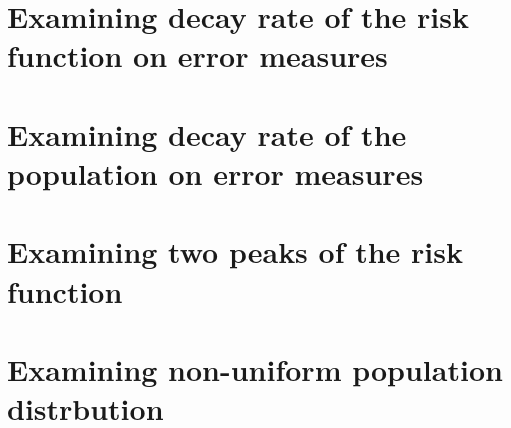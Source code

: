 \section{Examining decay rate of the risk function on error measures}

\section{Examining decay rate of the population on error measures}

\section{Examining two peaks of the risk function}

\section{Examining non-uniform population distrbution}